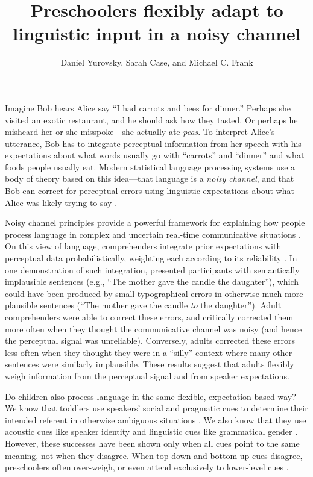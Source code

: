 \documentclass[man,floatsintext]{apa6}
\title{Preschoolers flexibly adapt to linguistic input in a noisy channel}
\author{Daniel Yurovsky, Sarah Case, and Michael C. Frank}
\affiliation{Stanford University}
\begin{document}
\maketitle

Imagine Bob hears Alice say ``I had carrots and bees for dinner.'' Perhaps she visited an exotic restaurant, and he should ask how they tasted. Or perhaps he misheard her or she misspoke---she actually ate \emph{peas}. To interpret Alice's utterance, Bob has to integrate perceptual information from her speech with his expectations about what words usually go with ``carrots'' and ``dinner'' and what foods people usually eat. Modern statistical language processing systems use a body of theory based on this idea---that language is a \emph{noisy channel}, and that Bob can correct for perceptual errors using linguistic expectations about what Alice was likely trying to say \cite{jelinek1976, shannon1948}.

Noisy channel principles provide a powerful framework for explaining how people process language in complex and uncertain real-time communicative situations \cite{clayards2008, levy2008, jaeger2010}. On this view of language, comprehenders integrate prior expectations with perceptual data probabilistically, weighting each according to its reliability \cite{ernst2002, jacobs1999}. In one demonstration of such integration,  presented participants with semantically implausible sentences (e.g., ``The mother gave the candle the daughter''), which could have been produced by small typographical errors in otherwise much more plausible sentences (``The mother gave the candle \emph{to} the daughter''). Adult comprehenders were able to correct these errors, and critically corrected them more often when they thought the communicative channel was noisy (and hence the perceptual signal was unreliable). Conversely, adults corrected these errors less often when they thought they were in a ``silly'' context where many other sentences were similarly implausible. These results suggest that adults flexibly weigh information from the perceptual signal and from speaker expectations.

Do children also process language in the same flexible, expectation-based way? We know that toddlers use speakers' social and pragmatic cues to determine their intended referent in otherwise ambiguous situations \cite{carpenter1998, clark2009}. We also know that they use acoustic cues like speaker identity and linguistic cues like grammatical gender \cite{lew-williams2007, creel2012}. However, these successes have been shown only when all cues point to the same meaning, not when they disagree. When top-down and bottom-up cues disagree, preschoolers often over-weigh, or even attend exclusively to lower-level cues \cite{trueswell1999,snedeker2004}.
\end{document}
